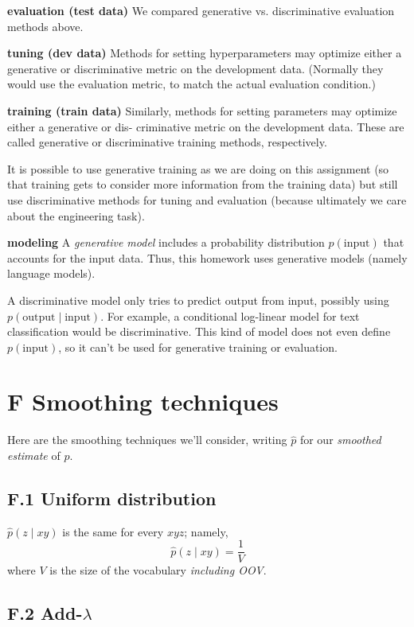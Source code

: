 \textbf{evaluation (test data)} We compared generative vs. discriminative evaluation methods above.  

\textbf{tuning (dev data)} Methods for setting hyperparameters may optimize either a generative or discriminative 
metric on the development data. (Normally they would use the evaluation metric, to match the actual 
evaluation condition.)  

\textbf{training (train data)} Similarly, methods for setting parameters may optimize either a generative or dis-
criminative metric on the development data. These are called generative or discriminative training 
methods, respectively.  

It is possible to use generative training as we are doing on this assignment (so that training gets to 
consider more information from the training data) but still use discriminative methods for tuning and 
evaluation (because ultimately we care about the engineering task).  

\textbf{modeling} A \textit{generative model} includes a probability distribution $p(\text{input})$ that accounts for the input data. 
Thus, this homework uses generative models (namely language models).  

A discriminative model only tries to predict output from input, possibly using $p(\text{output}\mid\text{input})$. For 
example, a conditional log-linear model for text classification would be discriminative. This kind of 
model does not even define $p(\text{input})$, so it can’t be used for generative training or evaluation.  

\section*{F \quad Smoothing techniques}

Here are the smoothing techniques we’ll consider, writing $\hat{p}$ for our \textit{smoothed estimate} of $p$.  

\subsection*{F.1 \quad Uniform distribution}

$\hat{p}(z \mid xy)$ is the same for every $xyz$; namely,  
\begin{equation}
\hat{p}(z \mid xy) = \frac{1}{V}
\end{equation}  
where $V$ is the size of the vocabulary \textit{including OOV}.  

\subsection*{F.2 \quad Add-$\lambda$}

